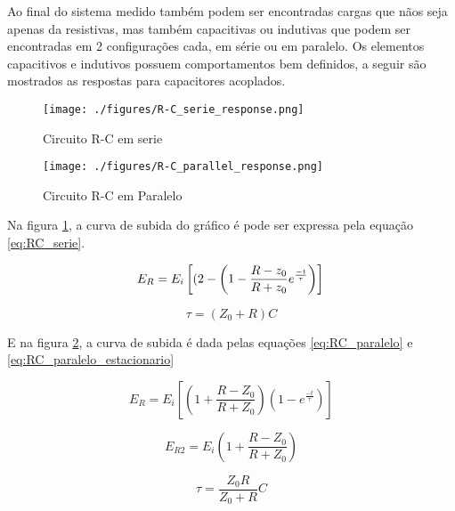 Ao final do sistema medido também podem ser encontradas cargas que nãos seja apenas da resistivas, mas também capacitivas ou indutivas que podem ser encontradas em 2 configurações cada, em série ou em paralelo. Os elementos capacitivos e indutivos possuem comportamentos bem definidos, a seguir são mostrados as respostas para capacitores acoplados.

\begin{figure}[htb!]
	\begin{center}
		\texttt{[image: ./figures/R-C\_serie\_response.png]}
		\caption{Circuito R-C em serie}
		\label{RC_serie}
	\end{center}
\end{figure}

\begin{figure}[htb!]
	\begin{center}
		\texttt{[image: ./figures/R-C\_parallel\_response.png]}
		\caption{Circuito R-C em Paralelo}
		\label{RC_paralelo}
	\end{center}
\end{figure}

Na figura \ref{RC_serie}, a curva de subida do gráfico é pode ser expressa pela equação \ref{eq:RC_serie}.

\begin{equation}
\label{eq:RC_serie}
E_R = E_i\left[(2 - \left(1-\frac{R-z_0}{R+z_0}e^{\frac{-t}{\tau}}\right)\right] \\
\end{equation}

\begin{equation}
\tau = (Z_0+R)C
\end{equation}

E na figura \ref{RC_paralelo}, a curva de subida é dada pelas equações \ref{eq:RC_paralelo} e \ref{eq:RC_paralelo_estacionario}

\begin{equation}
\label{eq:RC_paralelo}
E_R = E_i\left[\left( 1 + \frac{R-Z_0}{R+Z_0}\right)\left( 1 - e^{\frac{-t}{\tau}}\right)\right]
\end{equation}

\begin{equation}
\label{eq:RC_paralelo_estacionario}
E_{R2} = E_i \left(1+ \frac{R-Z_0}{R + Z_0}\right)
\end{equation}

\begin{equation}
\tau = \frac{Z_0R}{Z_0+R}C
\end{equation}

